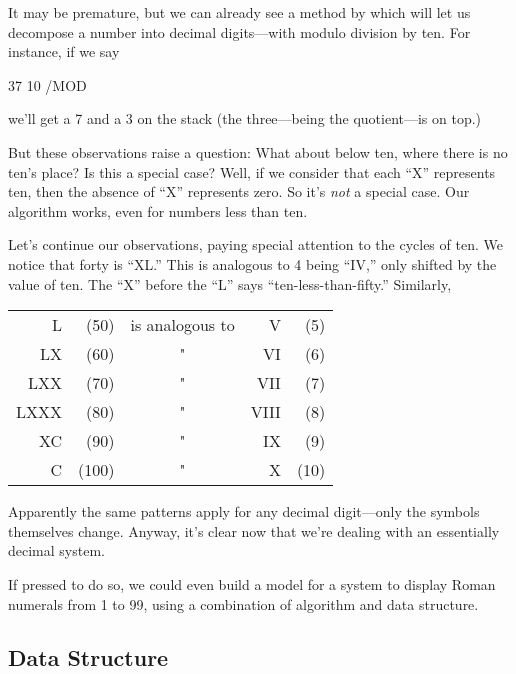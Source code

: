 \noindent It may be premature, but we can already see a method by
which \Forth{} will let us decompose a number into decimal digits---with
modulo division by ten. For instance, if we say

\begin{Code}
37 10 /MOD
\end{Code}
we'll get a 7 and a 3 on the stack (the three---being the quotient---is on
top.)

But these observations raise a question: What about below ten, where there
is no ten's place? Is this a special case? Well, if we consider that
each ``X'' represents ten, then the absence of ``X'' represents zero.  So
it's \emph{not} a special case. Our algorithm works, even for numbers less
than ten.

Let's continue our observations, paying special attention to the
cycles of ten. We notice that forty is ``XL.'' This is analogous to 4 being
``IV,'' only shifted by the value of ten. The ``X'' before the ``L'' says
``ten-less-than-fifty.'' Similarly,

\bigskip
{\sf\begin{tabular}{rrcrr}
   L &  (50) &   is analogous to &     V & (5) \\
  LX &  (60) &          "        &    VI & (6) \\
 LXX &  (70) &          "        &   VII & (7) \\
LXXX &  (80) &          "        &  VIII & (8) \\
  XC &  (90) &          "        &    IX & (9) \\
   C & (100) &          "        &     X & (10) \\
\end{tabular}}
\bigskip

\noindent Apparently the same patterns apply for any decimal digit---only
the symbols themselves change. Anyway, it's clear now that we're dealing
with an essentially decimal system.

If pressed to do so, we could even build a model for a system to display
Roman numerals from 1 to 99, using a combination of algorithm and
data structure.

\subsection{Data Structure}

